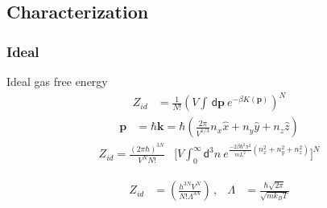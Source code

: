 \documentclass{beamer}
\newcommand*{\diff}{\mathsf{d}}
\begin{document}
\subsection*{Characterization}
\subsubsection*{Ideal}
\begin{frame}{Ideal gas free energy}
				\begin{align*}
					Z_{id} &= \frac{1}{N!}\left(V\int \,\diff\mathbf{p}~e^{-\beta K(\mathbf{p})}\right)^{N}	 	
				\end{align*}
				\begin{align*}
					\mathbf{p} &= \hbar \mathbf{k} = \hbar\left( \frac{2\pi}{V^{1/3}}n_x \hat x + n_y \hat y + n_z \hat z\right)
				\end{align*}
				\begin{align*}
					Z_{id} = \frac{(2\pi\hbar)^{3N}}{V^N N!}&\Big[V \int_0^\infty \diff^3 n ~e^{ \frac{-2\beta \hbar^2\pi^2}{mL^2}(n_x^2 + n_y^2 + n_z^2)}\Big]^{N} 	
				\end{align*} 
				 
				\begin{align*}
    				Z_{id} &= \left(\frac{h^{3N} V^N}{N!\Lambda^{3N}}\right) \,, & \Lambda &= \frac{\hbar\sqrt{2\pi}}{\sqrt{m k_B T}}
				\end{align*}
\end{frame}
\end{document}
